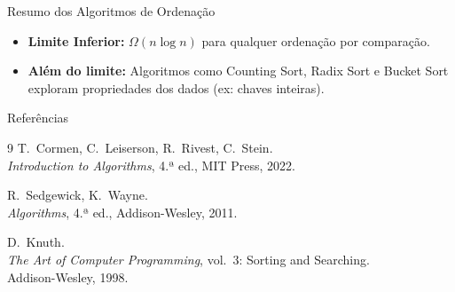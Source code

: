 \documentclass[aspectratio=169]{beamer}
\begin{document}
\begin{frame}[shrink=5]{Resumo dos Algoritmos de Ordenação}
  \begin{center}
  \renewcommand{\arraystretch}{1.2}
  \end{center}

  \begin{itemize}
    \item \textbf{Limite Inferior:} $\Omega(n \log n)$ para qualquer ordenação por comparação.
    \item \textbf{Além do limite:} Algoritmos como Counting Sort, Radix Sort e Bucket Sort exploram propriedades dos dados (ex: chaves inteiras).
  \end{itemize}
\end{frame}

\begin{frame}[shrink=10]{Referências}
  \begin{thebibliography}{9}
      T.\ Cormen, C.\ Leiserson, R.\ Rivest, C.\ Stein.\\
      \textit{Introduction to Algorithms}, 4.ª ed., MIT Press, 2022.

      R.\ Sedgewick, K.\ Wayne.\\
      \textit{Algorithms}, 4.ª ed., Addison-Wesley, 2011.

      D.\ Knuth.\\
      \textit{The Art of Computer Programming}, vol.\ 3: Sorting and Searching.\\
      Addison-Wesley, 1998.
  \end{thebibliography}
\end{frame}
\end{document}
